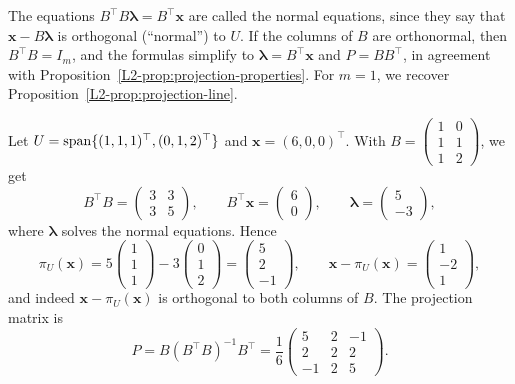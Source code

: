 The equations $B^\top B \boldsymbol{\lambda} = B^\top \mathbf{x}$ are called the normal equations, since they say that $\mathbf{x} - B\boldsymbol{\lambda}$ is orthogonal (``normal'') to $U$. If the columns of $B$ are orthonormal, then $B^\top B = I_m$, and the formulas simplify to $\boldsymbol{\lambda} = B^\top \mathbf{x}$ and $P = BB^\top$, in agreement with Proposition~\ref{L2-prop:projection-properties}. For $m = 1$, we recover Proposition~\ref{L2-prop:projection-line}.

\begin{example}\label{L2-ex:projection-plane}
    Let $U = \operatorname{span}\{(1, 1, 1)^\top, (0, 1, 2)^\top\}$ and $\mathbf{x} = (6, 0, 0)^\top$. With $B = \begin{pmatrix} 1 & 0 \\ 1 & 1 \\ 1 & 2 \end{pmatrix}$, we get
    \[B^\top B = \begin{pmatrix} 3 & 3 \\ 3 & 5 \end{pmatrix}, \qquad B^\top \mathbf{x} = \begin{pmatrix} 6 \\ 0 \end{pmatrix}, \qquad \boldsymbol{\lambda} = \begin{pmatrix} 5 \\ -3 \end{pmatrix},\]
    where $\boldsymbol{\lambda}$ solves the normal equations. Hence
    \[\pi_U(\mathbf{x}) = 5 \begin{pmatrix} 1 \\ 1 \\ 1 \end{pmatrix} - 3 \begin{pmatrix} 0 \\ 1 \\ 2 \end{pmatrix} = \begin{pmatrix} 5 \\ 2 \\ -1 \end{pmatrix}, \qquad \mathbf{x} - \pi_U(\mathbf{x}) = \begin{pmatrix} 1 \\ -2 \\ 1 \end{pmatrix},\]
    and indeed $\mathbf{x} - \pi_U(\mathbf{x})$ is orthogonal to both columns of $B$. The projection matrix is
    \[P = B (B^\top B)^{-1} B^\top = \frac{1}{6} \begin{pmatrix} 5 & 2 & -1 \\ 2 & 2 & 2 \\ -1 & 2 & 5 \end{pmatrix}.\]
\end{example}

